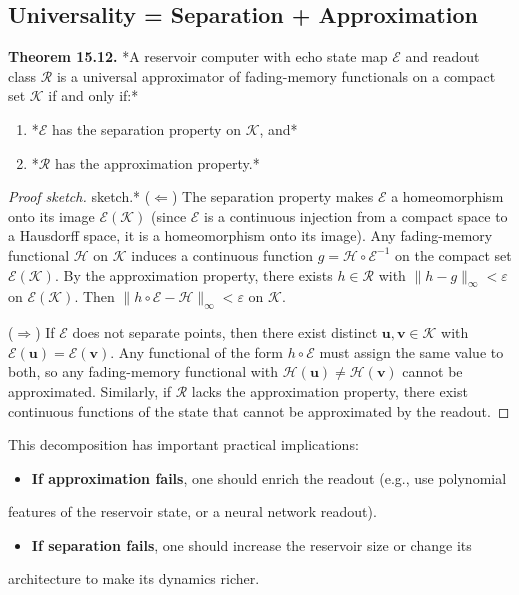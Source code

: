 \subsection{Universality = Separation + Approximation}\label{sec:15.4.3}

\textbf{Theorem 15.12.} *A reservoir computer with echo state map $\mathcal{E}$ and readout
class $\mathcal{R}$ is a universal approximator of fading-memory functionals on a
compact set $\mathcal{K}$ if and only if:*

\begin{enumerate}[nosep]
  \item *$\mathcal{E}$ has the separation property on $\mathcal{K}$, and*
  \item *$\mathcal{R}$ has the approximation property.*
\end{enumerate}

\begin{proof}[Proof sketch]
sketch.* ($\Leftarrow$) The separation property makes $\mathcal{E}$ a homeomorphism
onto its image $\mathcal{E}(\mathcal{K})$ (since $\mathcal{E}$ is a continuous injection from
a compact space to a Hausdorff space, it is a homeomorphism onto its image). Any
fading-memory functional $\mathcal{H}$ on $\mathcal{K}$ induces a continuous function
$g = \mathcal{H} \circ \mathcal{E}^{-1}$ on the compact set $\mathcal{E}(\mathcal{K})$.
By the approximation property, there exists $h \in \mathcal{R}$ with $\|h - g\|_\infty < \varepsilon$
on $\mathcal{E}(\mathcal{K})$. Then $\|h \circ \mathcal{E} - \mathcal{H}\|_\infty < \varepsilon$
on $\mathcal{K}$.

($\Rightarrow$) If $\mathcal{E}$ does not separate points, then there exist distinct
$\mathbf{u}, \mathbf{v} \in \mathcal{K}$ with $\mathcal{E}(\mathbf{u}) = \mathcal{E}(\mathbf{v})$.
Any functional of the form $h \circ \mathcal{E}$ must assign the same value to both, so
any fading-memory functional with $\mathcal{H}(\mathbf{u}) \neq \mathcal{H}(\mathbf{v})$
cannot be approximated. Similarly, if $\mathcal{R}$ lacks the approximation property,
there exist continuous functions of the state that cannot be approximated by the
readout.
\end{proof}


This decomposition has important practical implications:

\begin{itemize}[nosep]
  \item \textbf{If approximation fails}, one should enrich the readout (e.g., use polynomial
\end{itemize}
  features of the reservoir state, or a neural network readout).
\begin{itemize}[nosep]
  \item \textbf{If separation fails}, one should increase the reservoir size or change its
\end{itemize}
  architecture to make its dynamics richer.

